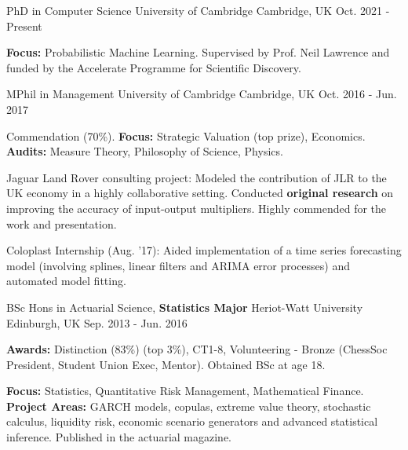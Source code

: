 

\begin{cventries}

  \cventry
    {PhD in Computer Science} %
    {University of Cambridge} %
    {Cambridge, UK} %
    {Oct. 2021 - Present} %
    {
      \begin{cvitems} %
        \item {\textbf{Focus:} Probabilistic Machine Learning. Supervised by Prof. Neil Lawrence and funded by the Accelerate Programme for Scientific Discovery.}
      \end{cvitems}
    }

  \cventry
    {MPhil in Management} %
    {University of Cambridge} %
    {Cambridge, UK} %
    {Oct. 2016 - Jun. 2017} %
    {
      \begin{cvitems} %
        \item {Commendation (70\%). \textbf{Focus:} Strategic Valuation (top prize), Economics. \textbf{Audits:} Measure Theory, Philosophy of Science, Physics.}
        \item {Jaguar Land Rover consulting project: Modeled the contribution of JLR to the UK economy in a highly collaborative setting. Conducted \textbf{original research} on improving the accuracy of input-output multipliers. Highly commended for the work and presentation.}
        \item {Coloplast Internship (Aug. '17): Aided implementation of a time series forecasting model (involving splines, linear filters and ARIMA error processes) and automated model fitting.}
      \end{cvitems}
    }

  \cventry
    {BSc Hons in Actuarial Science, \textbf{Statistics Major}} %
    {Heriot-Watt University} %
    {Edinburgh, UK} %
    {Sep. 2013 - Jun. 2016} %
    {
      \begin{cvitems} %
        \item {\textbf{Awards:} Distinction (83\%) (top 3\%), CT1-8, Volunteering - Bronze (ChessSoc President, Student Union Exec, Mentor). Obtained BSc at age 18.}
        \item {\textbf{Focus:} Statistics, Quantitative Risk Management, Mathematical Finance. \textbf{Project Areas:} GARCH models, copulas, extreme value theory, stochastic calculus, liquidity risk, economic scenario generators and advanced statistical inference. Published in the actuarial magazine.}
      \end{cvitems}
    }

  \vspace{-5mm}

\end{cventries}
